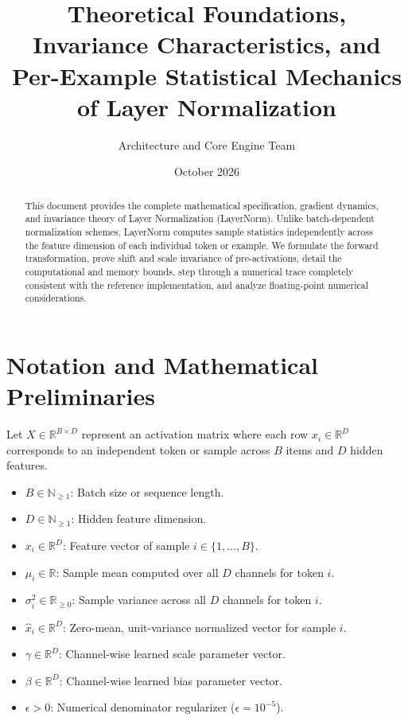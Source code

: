 \documentclass[11pt,a4paper]{article}
\title{\textbf{Theoretical Foundations, Invariance Characteristics, and Per-Example Statistical Mechanics of Layer Normalization}}
\author{Architecture and Core Engine Team}
\date{October 2026}
\theoremstyle{definition}
\begin{document}
\maketitle

\begin{abstract}
This document provides the complete mathematical specification, gradient dynamics, and invariance theory of Layer Normalization (LayerNorm). Unlike batch-dependent normalization schemes, LayerNorm computes sample statistics independently across the feature dimension of each individual token or example. We formulate the forward transformation, prove shift and scale invariance of pre-activations, detail the computational and memory bounds, step through a numerical trace completely consistent with the reference implementation, and analyze floating-point numerical considerations.
\end{abstract}

\section{Notation and Mathematical Preliminaries}

Let $X \in \mathbb{R}^{B \times D}$ represent an activation matrix where each row $x_i \in \mathbb{R}^D$ corresponds to an independent token or sample across $B$ items and $D$ hidden features.

\begin{itemize}
    \item $B \in \mathbb{N}_{\ge 1}$: Batch size or sequence length.
    \item $D \in \mathbb{N}_{\ge 1}$: Hidden feature dimension.
    \item $x_i \in \mathbb{R}^D$: Feature vector of sample $i \in \{1, \dots, B\}$.
    \item $\mu_i \in \mathbb{R}$: Sample mean computed over all $D$ channels for token $i$.
    \item $\sigma_i^2 \in \mathbb{R}_{\ge 0}$: Sample variance across all $D$ channels for token $i$.
    \item $\hat{x}_i \in \mathbb{R}^D$: Zero-mean, unit-variance normalized vector for sample $i$.
    \item $\gamma \in \mathbb{R}^D$: Channel-wise learned scale parameter vector.
    \item $\beta \in \mathbb{R}^D$: Channel-wise learned bias parameter vector.
    \item $\epsilon > 0$: Numerical denominator regularizer ($\epsilon = 10^{-5}$).
\end{itemize}
\end{document}
